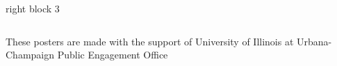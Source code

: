 \documentclass[leqno,presentation]{beamer}
\begin{document}
\begin{frame}
\begin{columns}[t]
\begin{column}{.25\linewidth}
\begin{block}{right block 3}

\end{block}

\end{column}

\end{columns}
  \begin{block}{}
   \begin{center}
   These posters are made with the support of University of Illinois at Urbana-Champaign Public Engagement Office
  \end{center}
  \end{block}



\end{frame}
\end{document}
